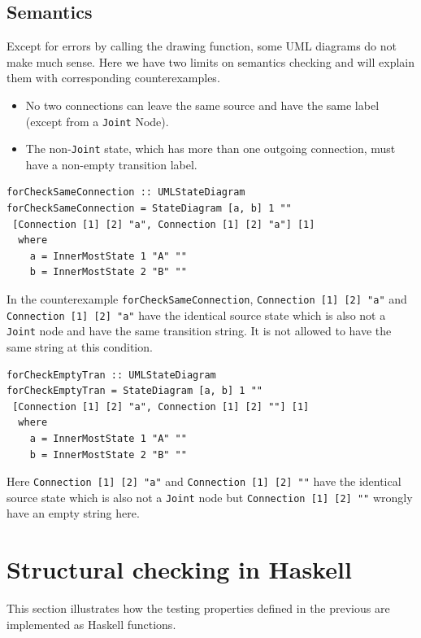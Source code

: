 \subsection{Semantics}
\label{sec:semantics}
Except for errors by calling the drawing function, some UML diagrams do not make much sense. 
Here we have two limits on semantics checking and will explain them with corresponding counterexamples.
\begin{itemize}
\item No two connections can leave the same source and have the same label (except from a \verb|Joint| Node).
\end{itemize}
\begin{itemize}
\item The non-\verb|Joint| state, which has more than one outgoing connection, must have a non-empty transition label.
\end{itemize}

\begin{verbatim}
forCheckSameConnection :: UMLStateDiagram
forCheckSameConnection = StateDiagram [a, b] 1 "" 
 [Connection [1] [2] "a", Connection [1] [2] "a"] [1]
  where
    a = InnerMostState 1 "A" ""
    b = InnerMostState 2 "B" ""
\end{verbatim}
In the counterexample \verb|forCheckSameConnection|, \verb|Connection [1] [2] "a"| and \verb|Connection [1] [2] "a"| have the identical source state which is also not a \verb|Joint| node and have the same transition string.
It is not allowed to have the same string at this condition.

\begin{verbatim}
forCheckEmptyTran :: UMLStateDiagram
forCheckEmptyTran = StateDiagram [a, b] 1 "" 
 [Connection [1] [2] "a", Connection [1] [2] ""] [1]
  where
    a = InnerMostState 1 "A" ""
    b = InnerMostState 2 "B" ""
\end{verbatim}

Here \verb|Connection [1] [2] "a"| and \verb|Connection [1] [2] ""| have the identical source state which is also not a \verb|Joint| node but \verb|Connection [1] [2] ""| wrongly have an empty string here.






\section{Structural checking in Haskell}
\label{sec:concept}
This section illustrates how the testing properties defined in the previous are implemented as Haskell functions.

